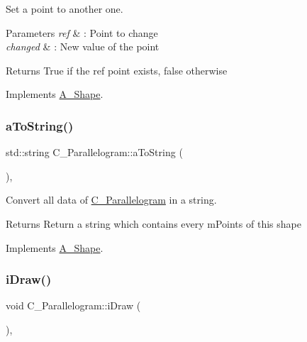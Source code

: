 Set a point to another one. 


\begin{DoxyParams}{Parameters}
{\em ref} & \+: Point to change \\
\hline
{\em changed} & \+: New value of the point \\
\hline
\end{DoxyParams}
\begin{DoxyReturn}{Returns}
True if the ref point exists, false otherwise 
\end{DoxyReturn}


Implements \hyperlink{classA__Shape_a6996f454b337f8425ad13cba3f7a7c35}{A\+\_\+\+Shape}.

\mbox{\label{classC__Parallelogram_add67ef2aba5e14c27e30a958e4843223}} 
\subsubsection{\texorpdfstring{a\+To\+String()}{aToString()}}
{\footnotesize\ttfamily std\+::string C\+\_\+\+Parallelogram\+::a\+To\+String (\begin{DoxyParamCaption}{ }\end{DoxyParamCaption})\hspace{0.3cm}{\ttfamily [override]}, {\ttfamily [virtual]}}



Convert all data of \hyperlink{classC__Parallelogram}{C\+\_\+\+Parallelogram} in a string. 

\begin{DoxyReturn}{Returns}
Return a string which contains every m\+Points of this shape 
\end{DoxyReturn}


Implements \hyperlink{classA__Shape_ad8804b4e74543db374af6892367b7c2e}{A\+\_\+\+Shape}.

\mbox{\label{classC__Parallelogram_a6d43cc787a39def68c7b7de4a33caf5e}} 
\subsubsection{\texorpdfstring{i\+Draw()}{iDraw()}\hspace{0.1cm}{\footnotesize\ttfamily [1/2]}}
{\footnotesize\ttfamily void C\+\_\+\+Parallelogram\+::i\+Draw (\begin{DoxyParamCaption}{ }\end{DoxyParamCaption})\hspace{0.3cm}{\ttfamily [override]}, {\ttfamily [virtual]}}




